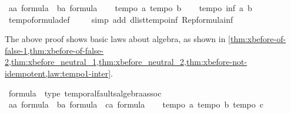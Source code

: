\begin{isabellebody}
\ a{\isacharcolon}{\isacharcolon}{\isachardoublequoteopen}{\isacharprime}a\ formula{\isachardoublequoteclose}\ \ b{\isacharcolon}{\isacharcolon}{\isachardoublequoteopen}{\isacharprime}a\ formula{\isachardoublequoteclose}\isanewline
\ \ \isamarkupfalse%
\ {\isachardoublequoteopen}tempo{}\ a{\isachardoublequoteclose}\ {\isachardoublequoteopen}tempo{}\ b{\isachardoublequoteclose}\isanewline
\ \ \isamarkupfalse%
\ {\isachardoublequoteopen}tempo{}\ {\isacharparenleft}inf\ a\ b{\isacharparenright}{\isachardoublequoteclose}\isanewline
\ \ \isamarkupfalse%
\ tempo{}{\isacharunderscore}formula{\isacharunderscore}def\ \isanewline
\ \ \isamarkupfalse%
\ {\isacharparenleft}simp\ add{\isacharcolon}\ dlist{\isacharunderscore}tempo{}{\isacharunderscore}inf\ Rep{\isacharunderscore}formula{\isacharunderscore}inf{\isacharparenright}\isanewline
{}\isamarkupfalse%
%
\endisatagproof
{\isafoldproof}%
%
\isadelimproof
%
\endisadelimproof
%
\begin{isamarkuptext}%
The above proof shows basic laws about \ac{algebra}, as shown in \cref{thm:xbefore-of-false-1,thm:xbefore-of-false-2,thm:xbefore_neutral_1,thm:xbefore_neutral_2,thm:xbefore-not-idempotent,law:tempo1-inter}.%
\end{isamarkuptext}\isamarkuptrue%
\isamarkupfalse%
%
\isamarkuptrue%
\isamarkupfalse%
\ formula\ {\isacharcolon}{\isacharcolon}\ {\isacharparenleft}type{\isacharparenright}\ temporal{\isacharunderscore}faults{\isacharunderscore}algebra{\isacharunderscore}assoc\isanewline
{}\isanewline
\isanewline
{}\isamarkupfalse%
%
\isadelimproof
\ %
\endisadelimproof
%
\isatagproof
{}\isamarkupfalse%
\isanewline
\ \ \isamarkupfalse%
\ a{\isacharcolon}{\isacharcolon}{\isachardoublequoteopen}{\isacharprime}a\ formula{\isachardoublequoteclose}\ \ b{\isacharcolon}{\isacharcolon}{\isachardoublequoteopen}{\isacharprime}a\ formula{\isachardoublequoteclose}\ \ c{\isacharcolon}{\isacharcolon}{\isachardoublequoteopen}{\isacharprime}a\ formula{\isachardoublequoteclose}\isanewline
\ \ \isamarkupfalse%
\ {\isachardoublequoteopen}tempo{}\ a{\isachardoublequoteclose}\ {\isachardoublequoteopen}tempo{}\ b{\isachardoublequoteclose}\ {\isachardoublequoteopen}tempo{}\ c{\isachardoublequoteclose}\isanewline

\end{isabellebody}
